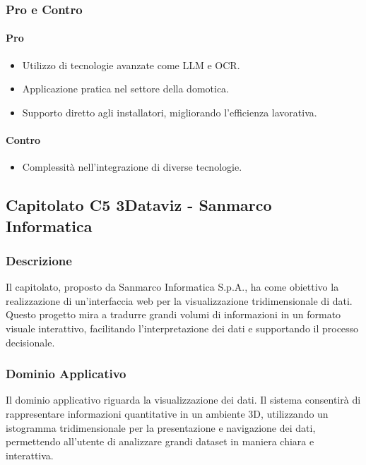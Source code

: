 \documentclass{article}
\begin{document}
\subsubsection{Pro e Contro}

\paragraph{Pro}
\begin{itemize}
    \item Utilizzo di tecnologie avanzate come LLM e OCR.
    \item Applicazione pratica nel settore della domotica.
    \item Supporto diretto agli installatori, migliorando l'efficienza lavorativa.
\end{itemize}

\paragraph{Contro}
\begin{itemize}
    \item Complessità nell'integrazione di diverse tecnologie.
\end{itemize}

\subsection{Capitolato C5 3Dataviz - Sanmarco Informatica}

\subsubsection{Descrizione}
Il capitolato, proposto da Sanmarco Informatica S.p.A., 
ha come obiettivo la realizzazione di un'interfaccia web 
per la visualizzazione tridimensionale di dati.
Questo progetto mira a tradurre grandi volumi di informazioni in un formato visuale interattivo, 
facilitando l'interpretazione dei dati e supportando il processo decisionale.

\subsubsection{Dominio Applicativo}
Il dominio applicativo riguarda la visualizzazione dei dati. 
Il sistema consentirà di rappresentare informazioni quantitative in un ambiente 3D, 
utilizzando un istogramma tridimensionale per la presentazione e navigazione dei dati, 
permettendo all'utente di analizzare grandi dataset in maniera chiara e interattiva.
\end{document}

